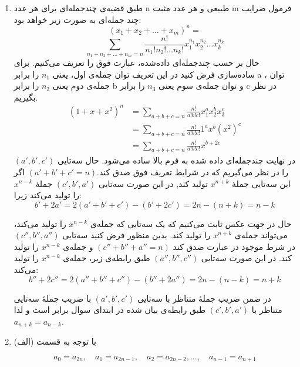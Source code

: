 	\begin{enumerate}
		\item 
        \p
        طبق قضیه‌ی چندجمله‌ای برای هر عدد n طبیعی و هر عدد مثبت m فرمول ضرایب چند جمله‌ای به صورت زیر خواهد بود:
        $$(x_1+x_2+\ldots+x_m)^n = $$
        $$\sum_{n_1+n_2+\ldots+n_m=n} \frac{n!}{n_1!n_2!\ldots n_k!} x_1^{n_1}x_2^{n_2}\ldots x_k^{n_k}$$
        حال بر حسب چندجمله‌ای داده‌شده، عبارت فوق را تعریف می‌کنیم. برای ساده‌سازی فرض کنید در این تعریف توان جمله‌ی اول، یعنی
        $n_1$
        را برابر a ،
        توان جمله‌ی دوم یعنی 
        $n_2$
        را برابر 
        b
        و توان جمله‌ی سوم یعنی
        $n_3$
        را برابر c در نظر بگیریم.\\
        \begin{align*}
		(1+x+x^2)^n &= \sum_{a+b+c=n} \frac{n!}{a!b!c!} x_1^{a} x_2^{b} x_3^{c}\\
		&= \sum_{a+b+c=n} \frac{n!}{a!b!c!} 1^{a} x^{b} (x^2)^{c}\\
		&= \sum_{a+b+c=n} \frac{n!}{a!b!c!} x^{b + 2c}
        \end{align*}
		در نهایت چندجمله‌ای داده شده به فرم بالا ساده می‌شود.
		حال سه‌تایی $(a',b',c')$ را در نظر می‌گیریم که در شرایط تعریف فوق صدق کند.$(a'+b'+c' = n)$
        اگر این سه‌تایی  جملهٔ $x^{n + k}$ تولید کند, در این صورت سه‌تایی $(c', b', a')$ جملهٔ $x^{n - k}$ را تولید می‌کند زیرا:
        $$b' + 2a' = 2(a' + b' + c') - (b' + 2c') = 2n - (n + k) = n -k$$
        
        \p
        حال در جهت عکس ثابت می‌کنیم که یک سه‌تایی که جمله‌ی
        $x^{n-k}$
        را تولید می‌کند، می‌تواند جمله‌ی
        $x^{n+k}$
        را تولید کند. بدین منظور فرض کنید سه‌تایی
        $(c'', b'', a'')$
        در شرط موجود در عبارت صدق کند
        $(c''+b''+a''=n)$
        و جمله‌ی
        $x^{n-k}$
        را تولید کند.
        در این صورت سه‌تایی
        $(a'',b'',c'')$
        طبق رابطه‌ی زیر، جمله‌ی 
        $x^{n-k}$
        را تولید می‌کند:
    	$$b'' + 2c'' = 2(a'' + b'' + c'') - (b'' + 2a'') = 2n - (n - k) = n +k$$
	
        \p
    	در ضمن ضریب جملهٔ متناظر با سه‌تایی $(a', b', c')$ با ضریب جملهٔ سه‌تایی متناظر با $(c', b', a')$ طبق رابطه‌ی بیان شده در ابتدای سوال برابر است و لذا $a_{n + k} = a_{n - k}$.
	
	\item
        \p
    	با توجه به قسمت (الف) 
    
    	$$a_0 = a_{2n},\quad a_1 = a_{2n - 1},\quad a_2 = a_{2n - 2}, \dots ,\quad a_{n - 1} = a_{n + 1}$$
    

\end{enumerate}
